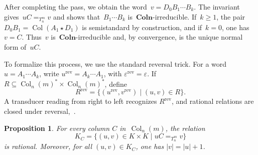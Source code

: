 \documentclass[a4paper, twoside, 11pt, english]{article}
\theoremstyle{plain}
\newtheorem{proposition}[subsubsection]{Proposition}
\theoremstyle{definition}
\DeclareMathOperator{\col}{Col}
\newcommand{\Colo}{\mathbf{Coln}}
\begin{document}
After completing the pass, we obtain the word~$v=D_0B_1\cdots B_k$.
The invariant gives~$uC=_{T_n^m}v$ and shows that~$B_1\cdots B_k$ is~$\Colo$-irreducible.
If~$k\ge1$, the pair~$D_0B_1=\col(A_1\star D_1)$ is
semistandard by construction, and if~$k=0$, one has~$v=C$.
Thus~$v$ is~$\Colo$-irreducible and, by convergence,
is the unique normal form of~$uC$.

To formalize this process, we use the standard reversal trick.
For a word~$u=A_1\cdots A_k$, write
$u^{\mathrm{rev}}=A_k\cdots A_1$, with
$\varepsilon^{\mathrm{rev}}=\varepsilon$.
If $R\subseteq \col_n(m)^*\times\col_n(m)^*$, define
\[
R^{\mathrm{rev}}
=
\{(u^{\mathrm{rev}},v^{\mathrm{rev}})\mid (u,v)\in R\}.
\]
A transducer reading from right to left recognizes
$R^{\mathrm{rev}}$, and rational relations are closed under reversal,~\cite[p.~65--66]{Ber79}.

\begin{proposition}
\label{prop:right-mult}
For every column $C$ in~$\col_n(m)$, the relation
\[
K_C=\{(u,v)\in K\times K\mid uC =_{T_n^m} v\}
\]
is rational. Moreover, for all $(u,v)\in K_C$, one has $|v|=|u|+1$.
\end{proposition}
\end{document}
